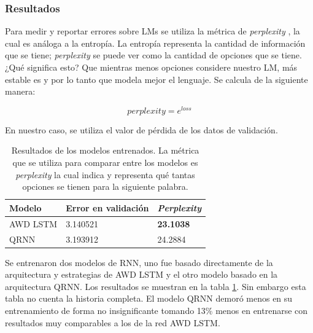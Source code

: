\subsubsection{Resultados}

Para medir y reportar errores sobre LMs se utiliza la métrica de \textit{perplexity} \parencite{jurafsky2014speech}, la cual es análoga a la entropía. La entropía representa la cantidad de información que se tiene; \textit{perplexity} se puede ver como la cantidad de opciones que se tiene. ¿Qué significa esto? Que mientras menos opciones considere nuestro LM, más estable es y por lo tanto que modela mejor el lenguaje. Se calcula de la siguiente manera:

$$ perplexity = e^{loss} $$

En nuestro caso, se utiliza el valor de pérdida de los datos de validación.

\begin{table}
\centering
\begin{tabular}{|l|l|l|}
\hline
Modelo & Error en validación & \textit{Perplexity} \\
\hline
AWD LSTM & 3.140521 & \textbf{23.1038} \\
QRNN & 3.193912 & 24.2884 \\
\hline
\end{tabular}
\caption{Resultados de los modelos entrenados. La métrica que se utiliza para comparar entre los modelos es \textit{perplexity} la cual indica y representa qué tantas opciones se tienen para la siguiente palabra.}
\label{tab:modresults}
\end{table}

Se entrenaron dos modelos de RNN, uno fue basado directamente de la arquitectura y estrategias de AWD LSTM  y el otro modelo basado en la arquitectura QRNN. Los resultados se muestran en la tabla \ref{tab:modresults}. Sin embargo esta tabla no cuenta la historia completa. El modelo QRNN demoró menos en su entrenamiento de forma no insignificante tomando 13\% menos en entrenarse con resultados muy comparables a los de la red AWD LSTM.

